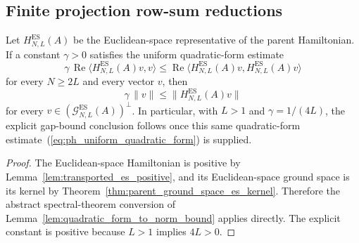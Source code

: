 \subsection{Finite projection row-sum reductions}\label{subsec:spectral_gap_rowsum}

\begin{lemma}
    \label{lem:parent_hamiltonian_es_quadratic_reduction}
    \leanok
    Let $H_{N,L}^{\mathrm{ES}}(A)$ be the Euclidean-space representative of the
    parent Hamiltonian. If a constant $\gamma > 0$ satisfies the uniform
    quadratic-form estimate
    \begin{equation}\label{eq:ph_uniform_quadratic_form}
        \gamma\,\operatorname{Re}\langle H_{N,L}^{\mathrm{ES}}(A)v, v\rangle
        \le
        \operatorname{Re}\langle H_{N,L}^{\mathrm{ES}}(A)v,
        H_{N,L}^{\mathrm{ES}}(A)v\rangle
    \end{equation}
    for every $N \ge 2L$ and every vector $v$, then
    \[
        \gamma\,\|v\| \le \|H_{N,L}^{\mathrm{ES}}(A)v\|
    \]
    for every $v \in (\mathcal G_{N,L}^{\mathrm{ES}}(A))^\perp$. In particular,
    with $L>1$ and $\gamma = 1/(4L)$, the explicit gap-bound conclusion follows
    once this same quadratic-form estimate~(\ref{eq:ph_uniform_quadratic_form}) is supplied.
\end{lemma}

\begin{proof}
    \leanok
    The Euclidean-space Hamiltonian is positive by
    Lemma~\ref{lem:transported_es_positive}, and its Euclidean-space ground
    space is its kernel by Theorem~\ref{thm:parent_ground_space_es_kernel}.
    Therefore the abstract spectral-theorem conversion of
    Lemma~\ref{lem:quadratic_form_to_norm_bound} applies directly. The
    explicit constant is positive because $L>1$ implies $4L>0$.
\end{proof}

